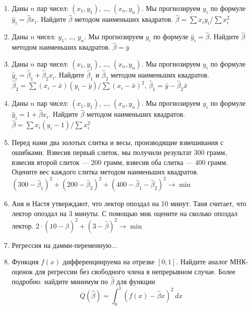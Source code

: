 \documentclass[pdftex,12pt,a4paper]{article}
\def \hb{\hat{\beta}}
\def \hy{\hat{y}}
\newcommand{\solution}[1]{ {\tiny #1} }
\newcommand{\problem}[1]{#1}
\begin{document}
\begin{enumerate}
\item \problem{Даны $n$ пар чисел: $(x_1, y_1)$, \ldots, $(x_n,y_n)$. Мы прогнозируем $y_i$ по формуле $\hy_i=\hb x_i$. Найдите $\hb$ методом наименьших квадратов. }
\solution{$\hb=\sum x_i y_i/\sum x_i^2$}

\item \problem{Даны $n$ чисел: $y_1$, \ldots, $y_n$. Мы прогнозируем $y_i$ по формуле $\hy_i=\hb$. Найдите $\hb$ методом наименьших квадратов. }
\solution{$\hb=\bar{y}$}

\item \problem{Даны $n$ пар чисел: $(x_1, y_1)$, \ldots, $(x_n,y_n)$. Мы прогнозируем $y_i$ по формуле $\hy_i=\hb_1+\hb_2 x_i$. Найдите $\hb_1$ и $\hb_2$ методом наименьших квадратов. }
\solution{$\hb_2=\sum (x_i-\bar{x})(y_i-\bar{y})/\sum(x_i-\bar{x})^2$, $\hb_1=\bar{y}-\hb_2\bar{x}$}

\item \problem{Даны $n$ пар чисел: $(x_1, y_1)$, \ldots, $(x_n,y_n)$. Мы прогнозируем $y_i$ по формуле $\hy_i=1+\hb x_i$. Найдите $\hb$ методом наименьших квадратов. }
\solution{$\hb=\sum x_i (y_i-1)/\sum x_i^2$}

\item \problem{ Перед нами два золотых слитка и весы, производящие взвешивания с ошибками. Взвесив первый слиток, мы получили результат $300$ грамм, взвесив второй слиток --- $200$ грамм, взвесив оба слитка --- $400$ грамм. Оцените вес каждого слитка методом наименьших квадратов.}
\solution{ $(300-\hb_1)^2+(200-\hb_2)^2+(400-\hb_1-\hb_2)^2\to\min$ }


\item Аня и Настя утверждают, что лектор опоздал на 10 минут. Таня считает, что лектор опоздал на 3 минуты. С помощью мнк оцените на сколько опоздал лектор. 
\solution{ $2\cdot (10-\hb)^2+(3-\hb)^2\to\min$ }

\item Регрессия на дамми-переменную...



\item Функция $f(x)$ дифференциируема на отрезке $[0;1]$. Найдите аналог МНК-оценок для регрессии без свободного члена в непрерывном случае. Более подробно: найдите минимум по $\hb$ для функции
\begin{equation}
Q(\hb)= \int_0^1 (f(x)-\hb x)^2\,dx
\end{equation}
\solution{}

\end{enumerate}
\end{document}
